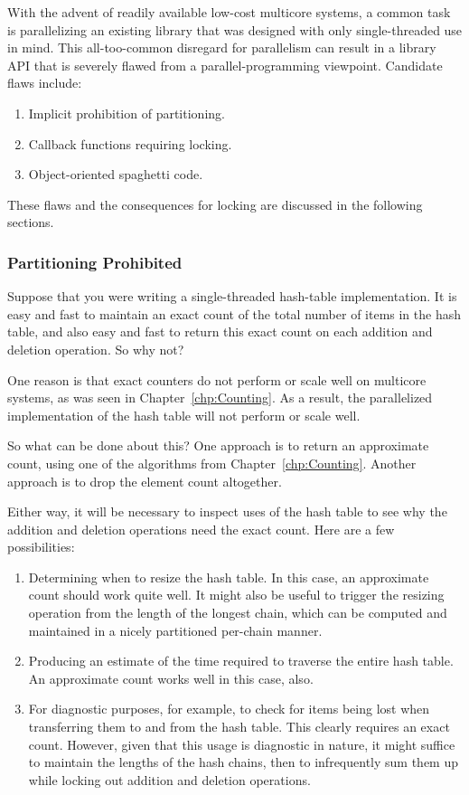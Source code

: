 With the advent of readily available low-cost multicore systems,
a common task is parallelizing an existing library that was designed
with only single-threaded use in mind.
This all-too-common disregard for parallelism can result in a library
API that is severely flawed from a parallel-programming viewpoint.
Candidate flaws include:

\begin{enumerate}
\item	Implicit prohibition of partitioning.
\item	Callback functions requiring locking.
\item	Object-oriented spaghetti code.
\end{enumerate}

These flaws and the consequences for locking are discussed in the following
sections.

\subsubsection{Partitioning Prohibited}
\label{sec:locking:Partitioning Prohibited}

Suppose that you were writing a single-threaded hash-table implementation.
It is easy and fast to maintain an exact count of the total number of items
in the hash table, and also easy and fast to return this exact count on each
addition and deletion operation.
So why not?

One reason is that exact counters do not perform or scale well on
multicore systems, as was
seen in Chapter~\ref{chp:Counting}.
As a result, the parallelized implementation of the hash table will not
perform or scale well.

So what can be done about this?
One approach is to return an approximate count, using one of the algorithms
from Chapter~\ref{chp:Counting}.
Another approach is to drop the element count altogether.

Either way, it will be necessary to inspect uses of the hash table to see
why the addition and deletion operations need the exact count.
Here are a few possibilities:

\begin{enumerate}
\item	Determining when to resize the hash table.
	In this case, an approximate count should work quite well.
	It might also be useful to trigger the resizing operation from
	the length of the longest chain, which can be computed and
	maintained in a nicely partitioned per-chain manner.
\item	Producing an estimate of the time required to traverse the
	entire hash table.
	An approximate count works well in this case, also.
\item	For diagnostic purposes, for example, to check for items being
	lost when transferring them to and from the hash table.
	This clearly requires an exact count.
	However, given that this usage is diagnostic in nature, it might
	suffice to maintain the lengths of the hash chains, then to
	infrequently sum them
	up while locking out addition and deletion operations.
\end{enumerate}

